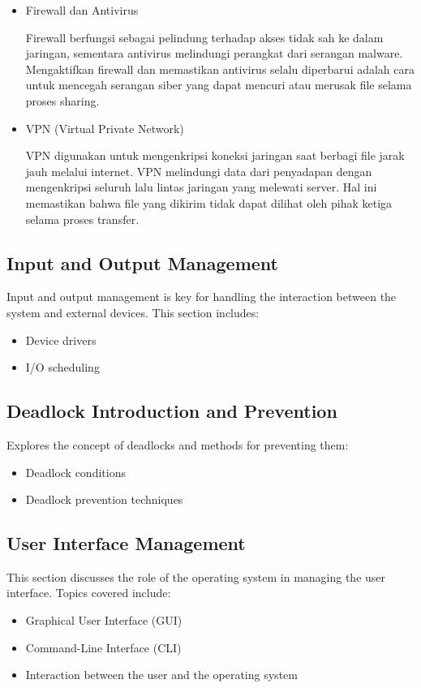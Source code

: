 \documentclass[12pt]{article}
\begin{document}
\begin{itemize}
\begin{itemize}
        \item Firewall dan Antivirus

        Firewall berfungsi sebagai pelindung terhadap akses tidak sah ke dalam jaringan, sementara antivirus melindungi perangkat dari serangan malware. Mengaktifkan firewall dan memastikan antivirus selalu diperbarui adalah cara untuk mencegah serangan siber yang dapat mencuri atau merusak file selama proses sharing.

        \item VPN (Virtual Private Network)

        VPN digunakan untuk mengenkripsi koneksi jaringan saat berbagi file jarak jauh melalui internet. VPN melindungi data dari penyadapan dengan mengenkripsi seluruh lalu lintas jaringan yang melewati server. Hal ini memastikan bahwa file yang dikirim tidak dapat dilihat oleh pihak ketiga selama proses transfer.
    \end{itemize}
\end{itemize}


\subsection{Input and Output Management}
Input and output management is key for handling the interaction between the system and external devices. This section includes:
\begin{itemize}
    \item Device drivers
    \item I/O scheduling
\end{itemize}

\subsection{Deadlock Introduction and Prevention}
Explores the concept of deadlocks and methods for preventing them:
\begin{itemize}
    \item Deadlock conditions
    \item Deadlock prevention techniques
\end{itemize}

\subsection{User Interface Management}
This section discusses the role of the operating system in managing the user interface. Topics covered include:
\begin{itemize}
    \item Graphical User Interface (GUI)
    \item Command-Line Interface (CLI)
    \item Interaction between the user and the operating system
\end{itemize}
\end{document}
